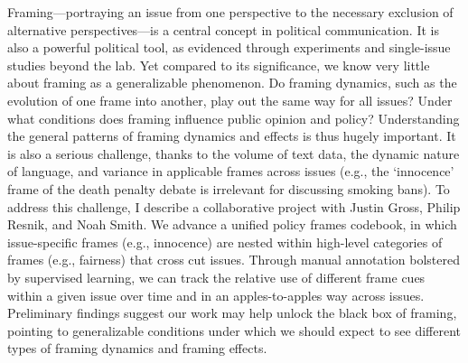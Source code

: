 Framing---portraying an issue from one perspective to the necessary exclusion of alternative perspectives---is a central concept in political communication. It is also a powerful political tool, as evidenced through experiments and single-issue studies beyond the lab. Yet compared to its significance, we know very little about framing as a generalizable phenomenon. Do framing dynamics, such as the evolution of one frame into another, play out the same way for all issues? Under what conditions does framing influence public opinion and policy? Understanding the general patterns of framing dynamics and effects is thus hugely important. It is also a serious challenge, thanks to the volume of text data, the dynamic nature of language, and variance in applicable frames across issues (e.g., the `innocence' frame of the death penalty debate is irrelevant for discussing smoking bans). To address this challenge, I describe a collaborative project with Justin Gross, Philip Resnik, and Noah Smith. We advance a unified policy frames codebook, in which issue-specific frames (e.g., innocence) are nested within high-level categories of frames (e.g., fairness) that cross cut issues. Through manual annotation bolstered by supervised learning, we can track the relative use of different frame cues within a given issue over time and in an apples-to-apples way across issues. Preliminary findings suggest our work may help unlock the black box of framing, pointing to generalizable conditions under which we should expect to see different types of framing dynamics and framing effects.
